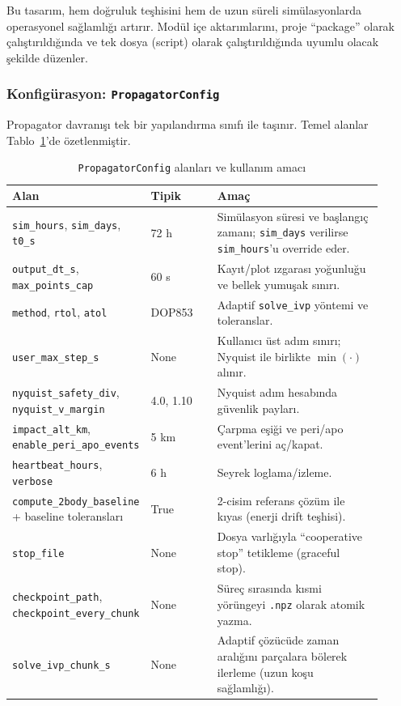 Bu tasarım, hem doğruluk teşhisini hem de uzun süreli simülasyonlarda operasyonel sağlamlığı artırır.
Modül içe aktarımlarını, proje ``package'' olarak çalıştırıldığında ve tek dosya (script) olarak çalıştırıldığında
uyumlu olacak şekilde düzenler.

\subsubsection*{Konfigürasyon: \texttt{PropagatorConfig}}
Propagator davranışı tek bir yapılandırma sınıfı ile taşınır. Temel alanlar Tablo~\ref{tab:prop_cfg}’de özetlenmiştir.

\begin{table}[H]
\centering
\caption{\texttt{PropagatorConfig} alanları ve kullanım amacı}
\label{tab:prop_cfg}
\begin{tabular}{p{0.28\linewidth} p{0.18\linewidth} p{0.45\linewidth}}
\hline
\textbf{Alan} & \textbf{Tipik} & \textbf{Amaç} \\
\hline
\texttt{sim\_hours}, \texttt{sim\_days}, \texttt{t0\_s} & 72 h & Simülasyon süresi ve başlangıç zamanı; \texttt{sim\_days} verilirse \texttt{sim\_hours}’u override eder. \\
\texttt{output\_dt\_s}, \texttt{max\_points\_cap} & 60 s & Kayıt/plot ızgarası yoğunluğu ve bellek yumuşak sınırı. \\
\texttt{method}, \texttt{rtol}, \texttt{atol} & DOP853 & Adaptif \texttt{solve\_ivp} yöntemi ve toleranslar. \\
\texttt{user\_max\_step\_s} & None & Kullanıcı üst adım sınırı; Nyquist ile birlikte \(\min(\cdot)\) alınır. \\
\texttt{nyquist\_safety\_div}, \texttt{nyquist\_v\_margin} & 4.0, 1.10 & Nyquist adım hesabında güvenlik payları. \\
\texttt{impact\_alt\_km}, \texttt{enable\_peri\_apo\_events} & 5 km & Çarpma eşiği ve peri/apo event’lerini aç/kapat. \\
\texttt{heartbeat\_hours}, \texttt{verbose} & 6 h & Seyrek loglama/izleme. \\
\texttt{compute\_2body\_baseline} + baseline toleransları & True & 2-cisim referans çözüm ile kıyas (enerji drift teşhisi). \\
\texttt{stop\_file} & None & Dosya varlığıyla ``cooperative stop'' tetikleme (graceful stop). \\
\texttt{checkpoint\_path}, \texttt{checkpoint\_every\_chunk} & None & Süreç sırasında kısmi yörüngeyi \texttt{.npz} olarak atomik yazma. \\
\texttt{solve\_ivp\_chunk\_s} & None & Adaptif çözücüde zaman aralığını parçalara bölerek ilerleme (uzun koşu sağlamlığı). \\
\hline
\end{tabular}
\end{table}

